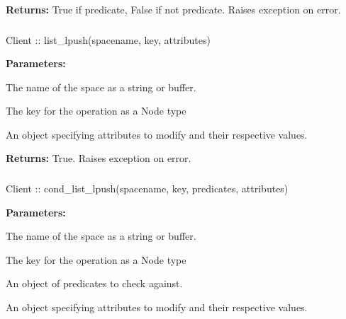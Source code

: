 \noindent\textbf{Returns:}
True if predicate, False if not predicate.  Raises exception on error.

\subsubsection{}
\label{api:nodejs:list_lpush}
\begin{javascriptcode}
Client :: list_lpush(spacename, key, attributes)
\end{javascriptcode}
\funcdesc 

\noindent\textbf{Parameters:}
\begin{description}[labelindent=\widthof{{\code{attributes}}},leftmargin=*,noitemsep,nolistsep,align=right]
\item[\code{spacename}] The name of the space as a string or buffer.
\item[\code{key}] The key for the operation as a Node type
\item[\code{attributes}] An object specifying attributes to modify and their respective values.
\end{description}

\noindent\textbf{Returns:}
True.  Raises exception on error.

\subsubsection{}
\label{api:nodejs:cond_list_lpush}
\begin{javascriptcode}
Client :: cond_list_lpush(spacename, key, predicates, attributes)
\end{javascriptcode}
\funcdesc 

\noindent\textbf{Parameters:}
\begin{description}[labelindent=\widthof{{\code{predicates}}},leftmargin=*,noitemsep,nolistsep,align=right]
\item[\code{spacename}] The name of the space as a string or buffer.
\item[\code{key}] The key for the operation as a Node type
\item[\code{predicates}] An object of predicates to check against.
\item[\code{attributes}] An object specifying attributes to modify and their respective values.
\end{description}

